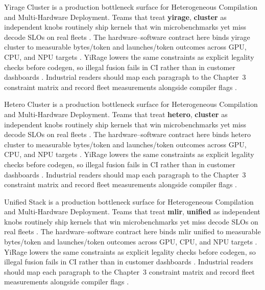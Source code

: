 Yirage Cluster is a production bottleneck surface for Heterogeneous Compilation and Multi-Hardware Deployment. Teams that treat \textbf{yirage}, \textbf{cluster} as independent knobs routinely ship kernels that win microbenchmarks yet miss decode SLOs on real fleets \citep{kwon2023vllm,patel2025llminference}. The hardware--software contract here binds yirage cluster to measurable bytes/token and launches/token outcomes across GPU, CPU, and NPU targets \citep{nvidia2024cudagraphs,taxbreak2026}. YiRage lowers the same constraints as explicit legality checks before codegen, so illegal fusion fails in CI rather than in customer dashboards \citep{liu2024deepseekv3,memoryfloor2026}. Industrial readers should map each paragraph to the Chapter~3 constraint matrix and record fleet measurements alongside compiler flags \citep{patel2025llminference,nvidia2022hopper}.

Hetero Cluster is a production bottleneck surface for Heterogeneous Compilation and Multi-Hardware Deployment. Teams that treat \textbf{hetero}, \textbf{cluster} as independent knobs routinely ship kernels that win microbenchmarks yet miss decode SLOs on real fleets \citep{nvidia2024cudagraphs,taxbreak2026}. The hardware--software contract here binds hetero cluster to measurable bytes/token and launches/token outcomes across GPU, CPU, and NPU targets \citep{liu2024deepseekv3,memoryfloor2026}. YiRage lowers the same constraints as explicit legality checks before codegen, so illegal fusion fails in CI rather than in customer dashboards \citep{patel2025llminference,nvidia2022hopper}. Industrial readers should map each paragraph to the Chapter~3 constraint matrix and record fleet measurements alongside compiler flags \citep{taxbreak2026,semianalysis2024tma}.

Unified Stack is a production bottleneck surface for Heterogeneous Compilation and Multi-Hardware Deployment. Teams that treat \textbf{mlir}, \textbf{unified} as independent knobs routinely ship kernels that win microbenchmarks yet miss decode SLOs on real fleets \citep{liu2024deepseekv3,memoryfloor2026}. The hardware--software contract here binds mlir unified to measurable bytes/token and launches/token outcomes across GPU, CPU, and NPU targets \citep{patel2025llminference,nvidia2022hopper}. YiRage lowers the same constraints as explicit legality checks before codegen, so illegal fusion fails in CI rather than in customer dashboards \citep{taxbreak2026,semianalysis2024tma}. Industrial readers should map each paragraph to the Chapter~3 constraint matrix and record fleet measurements alongside compiler flags \citep{memoryfloor2026,amd2024xdna}.

